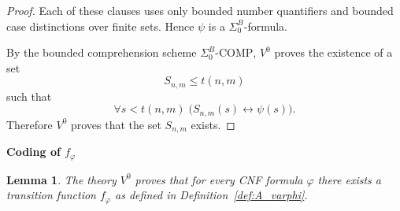 \documentclass{article}
\theoremstyle{plain}
\newtheorem{lemma}[theorem]{Lemma}
\theoremstyle{definition}
\begin{document}
\begin{proof}
Each of these clauses uses only bounded number quantifiers and bounded
case distinctions over finite sets.
Hence $\psi$ is a $\Sigma^B_0$-formula.

By the bounded comprehension scheme $\Sigma^B_0\text{-COMP}$,
$V^0$ proves the existence of a set
\[
S_{n,m} \le t(n,m)
\]
such that
\[
\forall s < t(n,m) \;
\bigl( S_{n,m}(s) \leftrightarrow \psi(s) \bigr).
\]
Therefore $V^0$ proves that the set $S_{n,m}$ exists.
\end{proof}

\medskip

\textbf{Coding of $f_\varphi$}

\begin{lemma}
The theory $V^0$ proves that for every CNF formula $\varphi$
there exists a transition function $f_\varphi$
as defined in Definition~\ref{def:A_varphi}.
\end{lemma}
\end{document}

